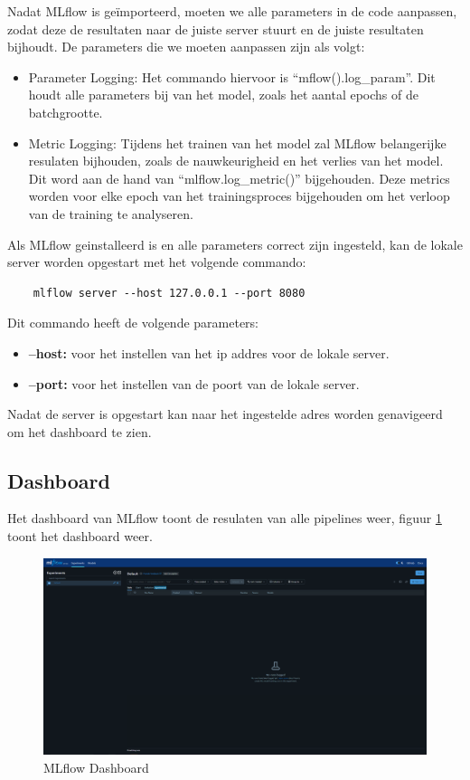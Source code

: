Nadat MLflow is geïmporteerd, moeten we alle parameters in de code aanpassen, zodat deze de resultaten naar de juiste server stuurt en de juiste resultaten bijhoudt. De parameters die we moeten aanpassen zijn als volgt:
\begin{itemize}
    \item Parameter Logging: Het commando hiervoor is ``mflow().log\_param''. Dit houdt alle parameters bij van het model, zoals het aantal epochs of de batchgrootte.
    \item Metric Logging: Tijdens het trainen van het model zal MLflow belangerijke resulaten bijhouden, zoals de nauwkeurigheid en het verlies van het model. Dit word aan de hand van ``mlflow.log\_metric()'' bijgehouden. Deze metrics worden voor elke epoch van het trainingsproces bijgehouden om het verloop van de training te analyseren.
\end{itemize}
Als MLflow geinstalleerd is en alle parameters correct zijn ingesteld, kan de lokale server worden opgestart met het volgende commando:
\begin{verbatim}
    mlflow server --host 127.0.0.1 --port 8080
\end{verbatim}
Dit commando heeft de volgende parameters:
\begin{itemize}
    \item \textbf{--host:} voor het instellen van het ip addres voor de lokale server.
    \item \textbf{--port:} voor het instellen van de poort van de lokale server.
\end{itemize}
Nadat de server is opgestart kan naar het ingestelde adres worden genavigeerd om het dashboard te zien.
\subsection{Dashboard}
Het dashboard van MLflow toont de resulaten van alle pipelines weer, figuur \ref{fig:mlflow_dashboard} toont het dashboard weer.
\begin{figure}[htbp]
    \includegraphics[width=\linewidth]{graphics/mlflow_dashboard.PNG}
    \caption{MLflow Dashboard}
    \label{fig:mlflow_dashboard}
\end{figure}

